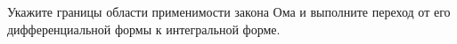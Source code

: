 \documentclass[__main__.tex]{subfiles}
\begin{document}
Укажите границы области применимости закона Ома и выполните переход от его дифференциальной формы к интегральной форме.\\ 

\end{document}
